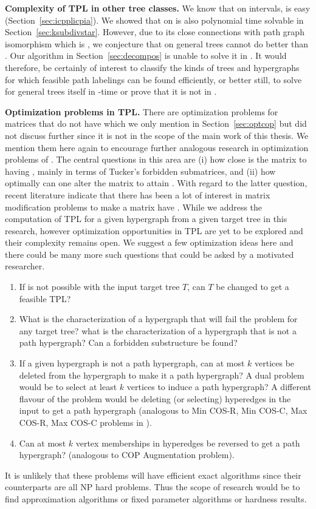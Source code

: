 \textbf{Complexity of TPL in other tree classes.}  We know that on
intervals, \CFTPL is easy (Section~\ref{sec:icpplicpia}).  We showed
that \CFTPL on {\kstar} is also polynomial time solvable in
Section~\ref{sec:ksubdivstar}. However, due to its close connections
with path graph isomorphism which is \gicomplete \cite{kklv10}, we
conjecture that \CFTPL on general trees cannot do better than
\gicomplete. Our algorithm in Section~\ref{sec:decompos} is unable to
solve it in \p. It would therefore, be certainly of interest to
classify the kinds of trees and hypergraphs for which feasible path
labelings can be found efficiently, or better still, to solve \CFTPL
for general trees itself in \p-time or prove that it is not in \p.


\textbf{Optimization problems in TPL.}  There are optimization
problems for matrices that do not have \COP which we only mention in
Section~\ref{sec:optcop} but did not discuss further since it is not
in the scope of the main work of this thesis. We mention them here
again to encourage further analogous research in optimization problems
of \TPL.  The central questions in this area are (i) how close is the
matrix to having \COP, mainly in terms of Tucker's forbidden
submatrices, and (ii) how optimally can one alter the matrix to attain
\COP.  With regard to the latter question, recent literature indicate
that there has been a lot of interest in matrix modification problems
to make a matrix have \COP \cite{hg02, tz07}. While we address the
computation of TPL for a given hypergraph from a given target tree in
this research, however optimization opportunities in TPL are yet to be
explored and their complexity remains open. We suggest a few
optimization ideas here and there could be many more such questions
that could be asked by a motivated researcher. 
\begin{enumerate}
\item If \CFTPL is not possible with the input target tree $T$, 
  can $T$ be changed to get a feasible TPL?
\item What is the characterization of a hypergraph that will fail the
  \CFTPL problem for any target tree? \ie what is the characterization
  of a hypergraph that is not a path hypergraph? Can a forbidden
  substructure be found?
\item If a given hypergraph is not a path hypergraph, can at most $k$
  vertices be deleted from the hypergraph to make it a path
  hypergraph? A dual problem would be to select at least $k$ vertices
  to induce a path hypergraph? A different flavour of the problem
  would be deleting (or selecting) hyperedges in the input to get a
  path hypergraph (analogous to {\sc Min COS-R, Min COS-C, Max
    COS-R, Max COS-C} problems in \COP).
\item Can at most $k$ vertex memberships in hyperedges be
  reversed to get a path hypergraph? (analogous to {\sc COP
    Augmentation} problem).
\end{enumerate}
It is unlikely that these problems will have efficient exact
algorithms since their \COP counterparts are all NP hard
problems. Thus the scope of research would be to find approximation
algorithms or fixed parameter algorithms or hardness results.



